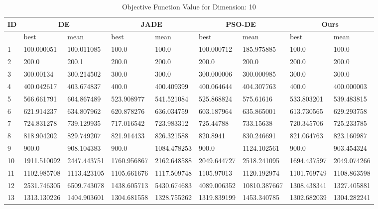 \begingroup
\renewcommand\arraystretch{0.7}
\begin{table*}[!t]
\centering
\caption{Objective Function Value for Dimension: 10}
 \begin{tabular}{|p{0.8cm}|p{1.6cm}|p{1.6cm}|p{1.6cm}|p{1.6cm}|p{1.6cm}|p{1.6cm}|p{1.6cm}|p{1.6cm}|} 
 \hline
 ID & \multicolumn{2}{c|}{DE} & \multicolumn{2}{c|}{JADE} & \multicolumn{2}{c|}{PSO-DE} & \multicolumn{2}{c|}{Ours} \\
 \hline
    & best & mean & best & mean & best & mean & best & mean \\ [0.5ex] 
 \hline
1  & 100.000051 & 100.011085 & 100.0 & 100.0 & 100.000712 & 185.975885 & 100.0 & 100.0 \\ 
2  & 200.0 & 200.1 & 200.0 & 200.0 & 200.0 & 200.0 & 200.0 & 200.0 \\ 
3  & 300.00134 & 300.214502 & 300.0 & 300.0 & 300.000006 & 300.000985 & 300.0 & 300.0 \\ 
4  & 400.042617 & 403.674837 & 400.0 & 400.409399 & 400.064644 & 404.307763 & 400.0 & 400.000003 \\ 
5  & 566.661791 & 604.867489 & 523.908977 & 541.521084 & 525.868824 & 575.61616 & 533.803201 & 539.483815 \\ 
6  & 621.914237 & 634.807962 & 620.878276 & 636.034759 & 603.187964 & 635.865001 & 613.730565 & 629.293758 \\ 
7  & 724.831278 & 739.129935 & 717.016542 & 723.983312 & 725.44788 & 733.15638 & 720.345706 & 725.233785 \\ 
8  & 818.904202 & 829.749207 & 821.914433 & 826.321588 & 820.8941 & 830.246691 & 821.064763 & 823.160987 \\ 
9  & 900.0 & 908.104383 & 900.0 & 1084.478253 & 900.0 & 1124.102561 & 900.0 & 903.454324 \\ 
10  & 1911.510092 & 2447.443751 & 1760.956867 & 2162.648588 & 2049.644727 & 2518.241095 & 1694.437597 & 2049.074266 \\ 
11  & 1102.985708 & 1113.423105 & 1105.661676 & 1117.509748 & 1105.97013 & 1120.192974 & 1101.769749 & 1108.863598 \\ 
12  & 2531.746305 & 6509.743078 & 1438.605713 & 5430.674683 & 4089.006352 & 10810.387667 & 1308.438341 & 1327.405881 \\ 
13  & 1313.130226 & 1404.903601 & 1304.681558 & 1328.755262 & 1319.839199 & 1453.340785 & 1302.682039 & 1304.282241 \\ 

\end{tabular}
\end{table*}
